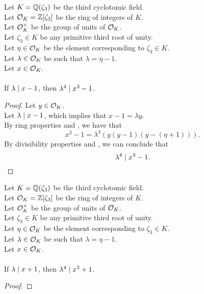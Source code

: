 \begin{lemma}
    \label{lmm:lambda_pow_four_dvd_cube_sub_one_of_dvd_sub_one}
    \leanok
    Let $K = \mathbb{Q}(\zeta_3)$ be the third cyclotomic field. \\
    Let $\mathcal{O}_K = \mathbb{Z}[\zeta_3]$ be the ring of integers of $K$. \\
    Let $\mathcal{O}^\times_K$ be the group of units of $\mathcal{O}_K$. \\
    Let $\zeta_3 \in K$ be any primitive third root of unity. \\
    Let $\eta \in \mathcal{O}_K$ be the element corresponding to $\zeta_3 \in K$. \\
    Let $\lambda \in \mathcal{O}_K$ be such that $\lambda = \eta -1$. \\
    Let $x \in \mathcal{O}_K$. \\\\
    If $\lambda\mid x - 1$, then $\lambda^ 4 \mid x^3 - 1$.
\end{lemma}
\begin{proof}
    \leanok
    Let $y\in \mathcal{O}_K$. \\
    Let $\lambda \mid x - 1$, which implies that $x - 1 = \lambda y$. \\
    By ring properties and , we have that
    $$x^3 - 1 = \lambda^3 (y (y - 1) (y - (\eta + 1))).$$
    By divisibility properties and ,
    we can conclude that $$\lambda^ 4 \mid x^3 - 1.$$
\end{proof}

\begin{lemma}
    \label{lmm:lambda_pow_four_dvd_cube_add_one_of_dvd_add_one}
    \leanok
    Let $K = \mathbb{Q}(\zeta_3)$ be the third cyclotomic field. \\
    Let $\mathcal{O}_K = \mathbb{Z}[\zeta_3]$ be the ring of integers of $K$. \\
    Let $\mathcal{O}^\times_K$ be the group of units of $\mathcal{O}_K$. \\
    Let $\zeta_3 \in K$ be any primitive third root of unity. \\
    Let $\eta \in \mathcal{O}_K$ be the element corresponding to $\zeta_3 \in K$. \\
    Let $\lambda \in \mathcal{O}_K$ be such that $\lambda = \eta -1$. \\
    Let $x \in \mathcal{O}_K$. \\\\
    If $\lambda \mid x + 1$, then $\lambda^4 \mid x ^ 3 + 1$.
\end{lemma}
\begin{proof}
    \leanok
\end{proof}

